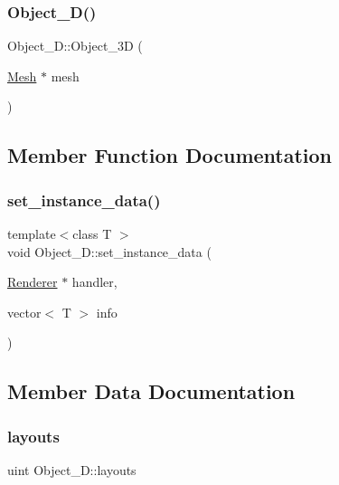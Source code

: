 \subsubsection{\texorpdfstring{Object\+\_\+D()}{Object\_3D()}}
{\footnotesize\ttfamily Object\+\_\+D\+::\+Object\+\_\+3D (\begin{DoxyParamCaption}\item[{\mbox{\hyperlink{structMesh}{Mesh}} $\ast$}]{mesh }\end{DoxyParamCaption})}



\subsection{Member Function Documentation}
\mbox{\label{classObject__3D_acde5ca17a5d5806291c8235e20302733}} 
\subsubsection{\texorpdfstring{set\+\_\+instance\+\_\+data()}{set\_instance\_data()}}
{\footnotesize\ttfamily template$<$class T $>$ \\
void Object\+\_\+D\+::set\+\_\+instance\+\_\+data (\begin{DoxyParamCaption}\item[{\mbox{\hyperlink{classRenderer}{Renderer}} $\ast$}]{handler,  }\item[{vector$<$ T $>$}]{info }\end{DoxyParamCaption})}



\subsection{Member Data Documentation}
\mbox{\label{classObject__3D_a8d3d45ffb70d9725a4907d23d0f73d62}} 
\subsubsection{\texorpdfstring{layouts}{layouts}}
{\footnotesize\ttfamily uint Object\+\_\+D\+::layouts}

